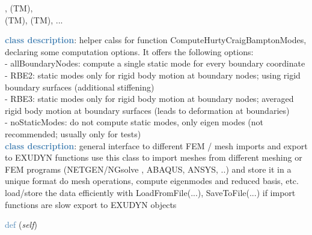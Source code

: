 \begin{itemize}[leftmargin=1.4cm]
\begin{itemize}[leftmargin=1.4cm]
\begin{itemize}[leftmargin=0.5cm]
\begin{itemize}[leftmargin=1.4cm]
\begin{itemize}[leftmargin=1.4cm]
\begin{itemize}[leftmargin=0.5cm]
, 
 (TM), 
\\  (TM), 
 (TM), 
 ...

\ei

%
\noindent\textcolor{steelblue}{{\bf class description}}:  helper calss for function ComputeHurtyCraigBamptonModes, declaring some computation options. It offers the following options:\\
 - allBoundaryNodes:     compute a single static mode for every boundary coordinate\\
 - RBE2:                 static modes only for rigid body motion at boundary nodes; using rigid boundary surfaces (additional stiffening)\\
 - RBE3:                 static modes only for rigid body motion at boundary nodes; averaged rigid body motion at boundary surfaces (leads to deformation at boundaries)\\
 - noStaticModes:        do not compute static modes, only eigen modes (not recommended; usually only for tests)
\vspace{3pt} \\ 
\noindent\textcolor{steelblue}{{\bf class description}}:  general interface to different FEM / mesh imports and export to EXUDYN functions
         use this class to import meshes from different meshing or FEM programs (NETGEN/NGsolve \cite{NGsolve2022}, ABAQUS, ANSYS, ..) and store it in a unique format
         do mesh operations, compute eigenmodes and reduced basis, etc.
         load/store the data efficiently with LoadFromFile(...), SaveToFile(...)  if import functions are slow
         export to EXUDYN objects
\vspace{3pt} \\ 
\begin{flushleft}
\noindent \textcolor{steelblue}{def {\bf {}}}\label{sec:FEM:FEMinterface:__init__}
({\it self})
\end{flushleft}

\end{itemize}
\end{itemize}
\end{itemize}
\end{itemize}
\end{itemize}
\end{itemize}
